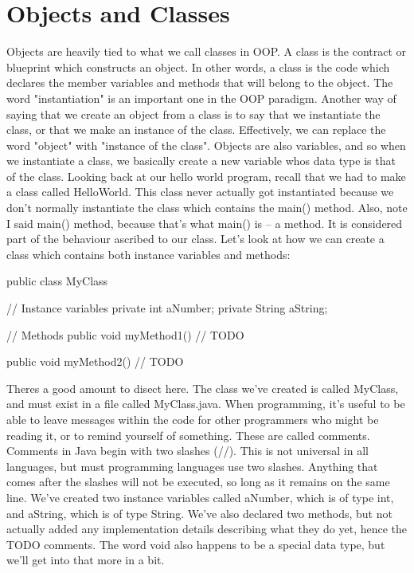 \documentclass{article}
\begin{document}
\section{Objects and Classes}

Objects are heavily tied to what we call classes in OOP. A class is the contract or blueprint which constructs
an object. In other words, a class is the code which declares the member variables and methods that will
belong to the object. The word "instantiation" is an important one in the OOP paradigm. Another way of saying
that we create an object from a class is to say that we instantiate the class, or that we make an instance of
the class. Effectively, we can replace the word "object" with "instance of the class". Objects are also
variables, and so when we instantiate a class, we basically create a new variable whos data type is that of
the class. Looking back at our hello world program, recall that we had to make a class called HelloWorld. This
class never actually got instantiated because we don’t normally instantiate the class which contains the main()
method. Also, note I said main() method, because that’s what main() is – a method. It is considered part of
the behaviour ascribed to our class. Let’s look at how we can create a class which contains both instance
variables and methods:

\begin{jlst}
public class MyClass {
    // Instance variables
    private int aNumber;
    private String aString;

    // Methods
    public void myMethod1() {
        // TODO
    }

    public void myMethod2() {
        // TODO
    }
}
\end{jlst}

Theres a good amount to disect here. The class we’ve created is called MyClass, and must exist in a file
called MyClass.java. When programming, it’s useful to be able to leave messages within the code for other
programmers who might be reading it, or to remind yourself of something. These are called comments. Comments
in Java begin with two slashes (//). This is not universal in all languages, but must programming languages use
two slashes. Anything that comes after the slashes will not be executed, so long as it remains on the same
line. We’ve created two instance variables called aNumber, which is of type int, and aString, which is of type
String. We’ve also declared two methods, but not actually added any implementation details describing what they
do yet, hence the TODO comments. The word void also happens to be a special data type, but we'll get into that
more in a bit.
\end{document}
